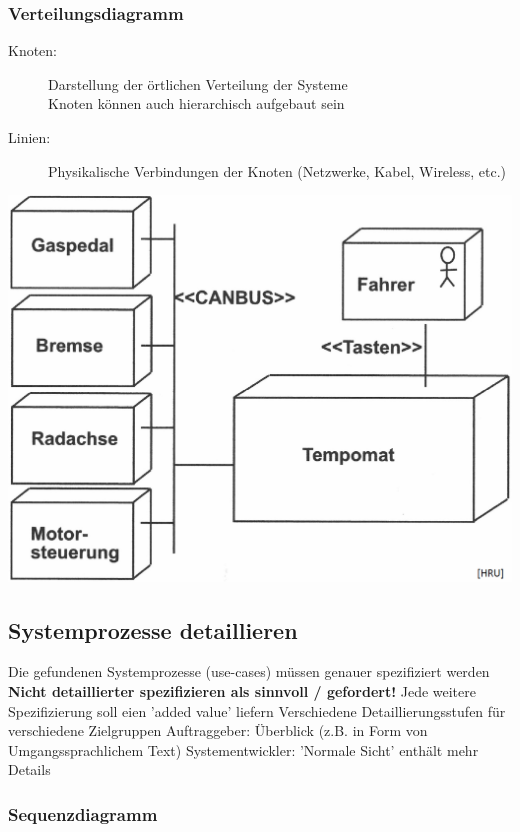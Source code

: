 \begin{minipage}[t]{0.5\columnwidth}
    \raggedright

    \subsubsection{Verteilungsdiagramm}
    
    \begin{description}
        \item[Knoten:] Darstellung der örtlichen Verteilung der Systeme \\
            Knoten können auch hierarchisch aufgebaut sein
        \item[Linien:] Physikalische Verbindungen der Knoten (Netzwerke, Kabel, Wireless, etc.)
    \end{description}
\end{minipage}
\hfill
\begin{minipage}[t]{0.46\columnwidth}
    
    \includegraphics[width=\columnwidth]{images/verteilungsdiagramm_tempomat.png}
\end{minipage}


\subsection{Systemprozesse detaillieren}

\begin{outline}
    \1 Die gefundenen Systemprozesse (use-cases) müssen genauer spezifiziert werden
        \2 \textbf{Nicht detaillierter spezifizieren als sinnvoll / gefordert!}
        \2 Jede weitere Spezifizierung soll eien 'added value' liefern
    \1 Verschiedene Detaillierungsstufen für verschiedene Zielgruppen
        \2 Auftraggeber: Überblick (z.B. in Form von Umgangssprachlichem Text)
        \2 Systementwickler: 'Normale Sicht' enthält mehr Details
\end{outline}


\subsubsection{Sequenzdiagramm}

